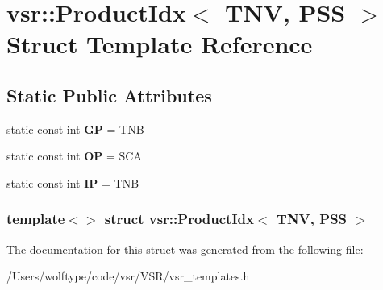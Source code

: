 \hypertarget{structvsr_1_1_product_idx_3_01_t_n_v_00_01_p_s_s_01_4}{\section{vsr\-:\-:Product\-Idx$<$ T\-N\-V, P\-S\-S $>$ Struct Template Reference}
\label{structvsr_1_1_product_idx_3_01_t_n_v_00_01_p_s_s_01_4}
}
\subsection*{Static Public Attributes}
\begin{DoxyCompactItemize}
\item 
\hypertarget{structvsr_1_1_product_idx_3_01_t_n_v_00_01_p_s_s_01_4_af47f398bde0afbd91312c60caeff842c}{static const int {\bfseries G\-P} = T\-N\-B}\label{structvsr_1_1_product_idx_3_01_t_n_v_00_01_p_s_s_01_4_af47f398bde0afbd91312c60caeff842c}

\item 
\hypertarget{structvsr_1_1_product_idx_3_01_t_n_v_00_01_p_s_s_01_4_a77ce52cbd66b615c52002804a4149c32}{static const int {\bfseries O\-P} = S\-C\-A}\label{structvsr_1_1_product_idx_3_01_t_n_v_00_01_p_s_s_01_4_a77ce52cbd66b615c52002804a4149c32}

\item 
\hypertarget{structvsr_1_1_product_idx_3_01_t_n_v_00_01_p_s_s_01_4_a2e940e15ef2f19ba63808a5c04bc25cc}{static const int {\bfseries I\-P} = T\-N\-B}\label{structvsr_1_1_product_idx_3_01_t_n_v_00_01_p_s_s_01_4_a2e940e15ef2f19ba63808a5c04bc25cc}

\end{DoxyCompactItemize}
\subsubsection*{template$<$$>$ struct vsr\-::\-Product\-Idx$<$ T\-N\-V, P\-S\-S $>$}



The documentation for this struct was generated from the following file\-:\begin{DoxyCompactItemize}
\item 
/\-Users/wolftype/code/vsr/\-V\-S\-R/vsr\-\_\-templates.\-h\end{DoxyCompactItemize}
